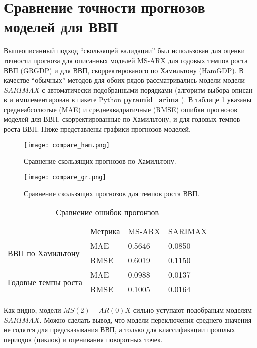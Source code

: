 \documentclass[../report.tex]{subfiles}
\begin{document}
	
	\section{Сравнение точности прогнозов моделей для ВВП}
	
	Вышеописанный подход ``скользящей валидации'' был использован для оценки точности прогноза для описанных моделей MS-ARX для годовых темпов роста ВВП (GRGDP) и для ВВП, скорректированого по Хамильтону (HamGDP). В качестве ``обычных'' методов для обоих рядов рассматривались модели модели $SARIMAX$ с автоматически подобранными порядками (алгоритм выбора описан в \cite{hynd_autoarima} и имплементирован в пакете Python \textbf{pyramid\_arima} \cite{pyramid_arima}). В таблице \ref{tbl:errors} указаны среднеабсолютые (MAE) и среднеквадратичные (RMSE) ошибки прогнозов моделей для ВВП, скорректированные по Хамильтону, и для годовых темпов роста ВВП. Ниже представлены графики прогнозов моделей.
	
	\begin{figure}
		\texttt{[image: compare\_ham.png]}
		\caption{Сравнение скользящих прогнозов по Хамильтону.}
		\label{fig:rollcompare-ham}
	\end{figure}
	
	\begin{figure}
		\texttt{[image: compare\_gr.png]}
		\caption{Сравнение скользящих прогнозов для темпов роста ВВП.}
		\label{fig:rollcompare-tr}
	\end{figure}
	
	\begin{table}[]
		\centering
		\caption{Сравнение ошибок прогонзов}
		\label{tbl:errors}
		\begin{tabular}{llll}
			& Метрика & MS-ARX & SARIMAX \\
			\multirow{2}{*}{ВВП по Хамильтону} & MAE    & 0.5646 & 0.0850  \\
			& RMSE   & 0.6019 & 0.1150  \\
			\multirow{2}{*}{Годовые темпы роста}       & MAE    & 0.0988 & 0.0137  \\
			& RMSE   & 0.1005 & 0.0164 
		\end{tabular}
	\end{table}
	
	
	Как видно, модели $MS(2)-AR(0)X$ сильно уступают подобраным моделям $SARIMAX$. Можно сделать вывод, что модели переключения среднего значения не годятся для предсказывания ВВП, а только для классификации прошлых периодов (циклов) и оценивания поворотных точек.
	
\end{document}
